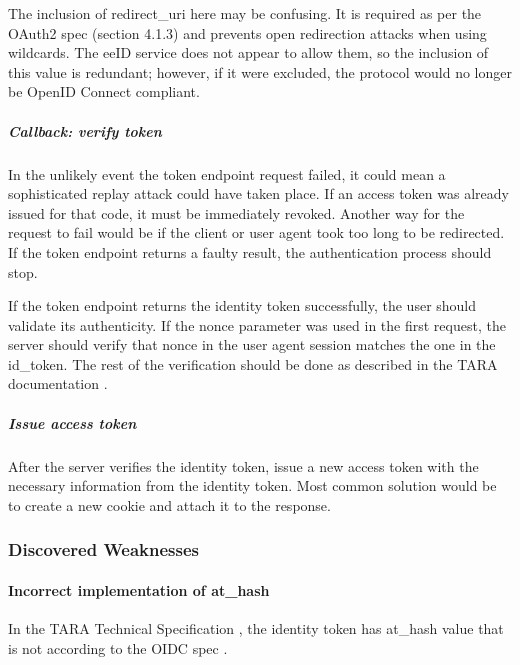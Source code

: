 The inclusion of redirect\_uri here may be confusing. It is required as per the OAuth2 spec (section 4.1.3) \cite{rfc6749} and prevents open redirection attacks when using wildcards. The eeID service does not appear to allow them, so the inclusion of this value is redundant; however, if it were excluded, the protocol would no longer be OpenID Connect compliant.

\subparagraph{Callback: verify token}

In the unlikely event the token endpoint request failed, it could mean a sophisticated replay attack could have taken place. If an access token was already issued for that code, it must be immediately revoked. Another way for the request to fail would be if the client or user agent took too long to be redirected. If the token endpoint returns a faulty result, the authentication process should stop.

If the token endpoint returns the identity token successfully, the user should validate its authenticity. If the nonce parameter was used in the first request, the server should verify that nonce in the user agent session matches the one in the id\_token. The rest of the verification should be done as described in the TARA documentation \cite{tara-technical}.


\subparagraph{Issue access token}

After the server verifies the identity token, issue a new access token with the necessary information from the identity token. Most common solution would be to create a new cookie and attach it to the response.


\subsubsection{Discovered Weaknesses}

\paragraph{Incorrect implementation of at\_hash}

In the TARA Technical Specification \cite{tara-technical}, the identity token has at\_hash value that is not according to the OIDC spec \cite{oidc}.

